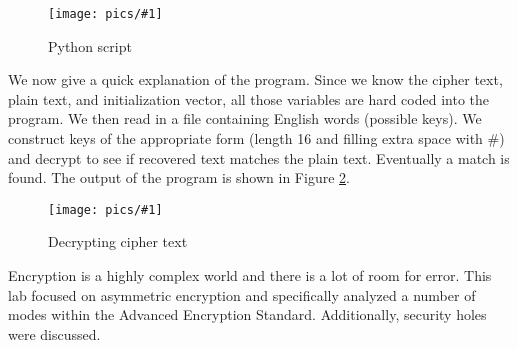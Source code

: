 \documentclass[11pt]{article}
\newcommand{\fig}[2]{ 
\begin{figure}[h]
	\centering
	\caption{#2}
	\texttt{[image: pics/\#1]}
	\label{fig:#1}
\end{figure} 
}
\begin{document}
\fig{task7.1}{Python script}

We now give a quick explanation of the program. Since we know the cipher text, plain text, and initialization vector, all those variables are hard coded into the program. We then read in a file containing English words (possible keys). We construct keys of the appropriate form (length 16 and filling extra space with \#) and decrypt to see if recovered text matches the plain text. Eventually a match is found. The output of the program is shown in Figure \ref{fig:task7.2}.

\fig{task7.2}{Decrypting cipher text}

Encryption is a highly complex world and there is a lot of room for error. This lab focused on asymmetric encryption and specifically analyzed a number of modes within the Advanced Encryption Standard. Additionally, security holes were discussed.
\end{document}
